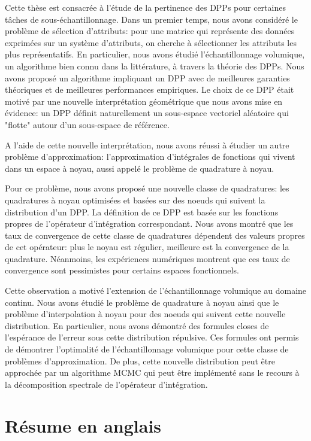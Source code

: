 \documentclass[twoside,11pt]{book}
\numberwithin{theorem}{chapter}
\numberwithin{definition}{chapter}
\numberwithin{proposition}{chapter}
\numberwithin{corollary}{chapter}
\numberwithin{example}{chapter}
\numberwithin{lemma}{chapter}
\numberwithin{assumption}{chapter}
\numberwithin{equation}{chapter}
\numberwithin{figure}{chapter}
\begin{document}
Cette thèse est consacrée à l'étude de la pertinence des DPPs pour certaines tâches de sous-échantillonnage.
Dans un premier temps, nous avons considéré le problème de sélection d'attributs: pour une matrice qui représente des données exprimées sur un système d'attributs, on cherche à sélectionner les attributs les plus représentatifs. En particulier, nous avons étudié l'échantillonnage volumique, un algorithme bien connu dans la littérature, à travers la théorie des DPPs. Nous avons proposé un algorithme impliquant un DPP avec de meilleures garanties théoriques et de meilleures performances empiriques. Le choix de ce DPP était motivé par une nouvelle interprétation géométrique que nous avons mise en évidence: un DPP définit naturellement un sous-espace vectoriel aléatoire qui "flotte" autour d'un sous-espace de référence. 

A l'aide de cette nouvelle interprétation, nous avons réussi à étudier un autre problème d'approximation: l'approximation d'intégrales de fonctions qui vivent dans un espace à noyau, aussi appelé le problème de quadrature à noyau.

Pour ce problème, nous avons proposé une nouvelle classe de quadratures: les quadratures à noyau optimisées et  basées sur des noeuds qui suivent la distribution d'un DPP. La définition de ce DPP est basée sur les fonctions propres de l'opérateur d'intégration correspondant. Nous avons montré que les taux de convergence de cette classe de quadratures dépendent des valeurs propres de cet opérateur: plus le noyau est régulier, meilleure est la convergence de la quadrature. Néanmoins, les expériences numériques montrent que ces taux de convergence sont pessimistes pour certains espaces fonctionnels.


Cette observation a motivé l'extension de l'échantillonnage volumique au domaine continu. Nous avons étudié le problème de quadrature à noyau ainsi que le problème d’interpolation à noyau pour des noeuds qui suivent cette nouvelle distribution. En particulier, nous avons démontré des formules closes de l'espérance de l'erreur sous cette distribution répulsive. Ces formules ont permis de démontrer l'optimalité de l’échantillonnage volumique pour cette classe de problèmes d'approximation. De plus, cette nouvelle distribution peut être approchée par un algorithme MCMC qui peut être implémenté sans le recours à la décomposition spectrale de l'opérateur d'intégration.

\section{Résume en anglais}
\end{document}
